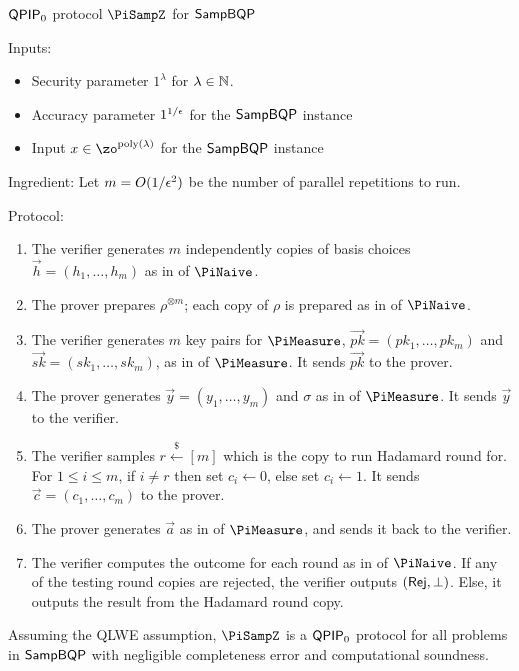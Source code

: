 \begin{protocol}{$\operatorname{\mathsf{QPIP}}_0$ protocol $\PiSampZ$ for $\operatorname{\mathsf{SampBQP}}$}
\label{proto:QPIP0samp}

Inputs:
    \begin{itemize}
        \item Security parameter $1^\lambda$ for $\lambda\in\mathbb{N}$.
        \item Accuracy parameter $1^{1/\epsilon}$ for the $\operatorname{\mathsf{SampBQP}}$ instance
        \item Input $x\in\zo^{\poly(\lambda)}$ for the $\operatorname{\mathsf{SampBQP}}$ instance
    \end{itemize}

Ingredient: Let $m=O(1/\epsilon^2)$ be the number of parallel repetitions to run.
    
Protocol:
\begin{enumerate}
    \item The verifier generates $m$ independently copies of basis choices $\vec{h}=(h_1,\ldots,h_m)$ as in  of $\PiNaive$.
    \item The prover prepares $\rho^{\otimes m}$; each copy of $\rho$ is prepared as in  of $\PiNaive$.
    \item The verifier generates $m$ key pairs for $\PiMeasure$, $\vec{pk}=(pk_1,\ldots,pk_m)$ and $\vec{sk}=(sk_1,\ldots,sk_m)$, as in  of $\PiMeasure$.
        It sends $\vec{pk}$ to the prover.
    \item The prover generates $\vec{y}=(y_1,\ldots,y_m)$ and $\sigma$ as in  of $\PiMeasure$.
        It sends $\vec{y}$ to the verifier.
    \item The verifier samples $r\xleftarrow{\$}[m]$ which is the copy to run Hadamard round for.
        For $1\leq i\leq m$, if $i\ne r$ then set $c_i\leftarrow 0$, else set $c_i\leftarrow 1$.
        It sends $\vec{c}=(c_1,\ldots,c_m)$ to the prover.
    \item The prover generates $\vec{a}$ as in  of $\PiMeasure$, and sends it back to the verifier.
    \item \label{step:multi-testing}
        The verifier computes the outcome for each round as in  of $\PiNaive$.
        If any of the testing round copies are rejected, the verifier outputs $(\mathsf{Rej}, \bot)$.
        Else, it outputs the result from the Hadamard round copy.
\end{enumerate}
\end{protocol}

\begin{theorem}\label{thm:qpip0}
    Assuming the QLWE assumption, $\PiSampZ$ is a $\operatorname{\mathsf{QPIP}}_0$ protocol for all problems in $\operatorname{\mathsf{SampBQP}}$ with negligible  completeness error and computational soundness.
\end{theorem}


